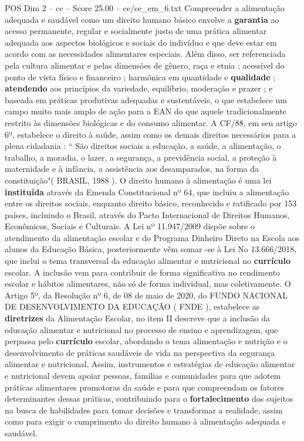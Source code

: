 \begin{textsample}{POS Dim 2 – ce – Score 25.00 – ce/ce\_em\_6.txt}
Compreender a alimentação adequada e saudável como um direito humano básico envolve a \textbf{garantia} ao acesso permanente, regular e socialmente justo de uma prática alimentar adequada aos aspectos biológicos e sociais do indivíduo e que deve estar em acordo com as necessidades alimentares especiais.
Além disso, ser referenciada pela cultura alimentar e pelas dimensões de gênero, raça e etnia ; acessível do ponto de vista físico e financeiro ; harmônica em quantidade e \textbf{qualidade} ; \textbf{atendendo} aos princípios da variedade, equilíbrio, moderação e prazer ; e baseada em práticas produtivas adequadas e sustentáveis, o que estabelece um campo muito mais amplo de ação para a EAN do que aquele tradicionalmente restrito às dimensões biológicas e do consumo alimentar.
A CF/88, em seu artigo 6º, estabelece o direito à saúde, assim como os demais direitos necessários para a plena cidadania : “ São direitos sociais a educação, a saúde, a alimentação, o trabalho, a moradia, o lazer, a segurança, a previdência social, a proteção à maternidade e à infância, a assistência aos desamparados, na forma da constituição"( BRASIL, 1988 ).
O direito humano à alimentação é uma lei \textbf{instituída} através da Emenda Constitucional nº 64, que incluiu a alimentação entre os direitos sociais, enquanto direito básico, reconhecido e ratificado por 153 países, incluindo o Brasil, através do Pacto Internacional de Direitos Humanos, Econômicos, Sociais e Culturais.
A Lei nº 11.947/2009 dispõe sobre o atendimento da alimentação escolar e do Programa Dinheiro Direto na Escola aos alunos da Educação Básica, posteriormente vêm somar -se à Lei No 13.666/2018, que inclui o tema transversal da educação alimentar e nutricional no \textbf{currículo} escolar.
A inclusão vem para contribuir de forma significativa no rendimento escolar e hábitos alimentares, não só de forma individual, mas coletivamente.
O Artigo 5º, da Resolução nº 6, de 08 de maio de 2020, do FUNDO NACIONAL DE DESENVOLVIMENTO DA EDUCAÇÃO ( FNDE ), estabelece as \textbf{diretrizes} da Alimentação Escolar, no item II descreve que a inclusão da educação alimentar e nutricional no processo de ensino e aprendizagem, que perpassa pelo \textbf{currículo} escolar, abordando o tema alimentação e nutrição e o desenvolvimento de práticas saudáveis de vida na perspectiva da segurança alimentar e nutricional.
Assim, instrumentos e estratégias de educação alimentar e nutricional devem apoiar pessoas, famílias e comunidades para que adotem práticas alimentares promotoras da saúde e para que compreendam os fatores determinantes dessas práticas, contribuindo para o \textbf{fortalecimento} dos sujeitos na busca de habilidades para tomar decisões e transformar a realidade, assim como para exigir o cumprimento do direito humano à alimentação adequada e saudável.

\end{textsample}
